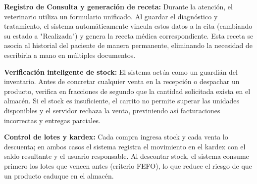 \documentclass[11pt,a4paper]{report}
\newcommand{\codigoreal}[6]{%
  }
\begin{document}
\codigoreal{codigo/CitaService.java}{78}{94}{Java}{Validación del horario de atención en CitaService.java}{lst:cita_horario}

\codigoreal{codigo/CitaService.java}{239}{256}{Java}{Prevención de traslapes de veterinario y mascota en CitaService.java}{lst:cita_traslape}

\textbf{Registro de Consulta y generación de receta:}
Durante la atención, el veterinario utiliza un formulario unificado. Al guardar el diagnóstico y tratamiento, el sistema automáticamente vincula estos datos a la cita (cambiando su estado a "Realizada") y genera la receta médica correspondiente. Esta receta se asocia al historial del paciente de manera permanente, eliminando la necesidad de escribirla a mano en múltiples documentos.

\textbf{Verificación inteligente de stock:}
El sistema actúa como un guardián del inventario. Antes de concretar cualquier venta en la recepción o despachar un producto, verifica en fracciones de segundo que la cantidad solicitada exista en el almacén. Si el stock es insuficiente, el carrito no permite superar las unidades disponibles y el servidor rechaza la venta, previniendo así facturaciones incorrectas y entregas parciales.

\textbf{Control de lotes y kardex:}
Cada compra ingresa stock y cada venta lo descuenta; en ambos casos el sistema registra el movimiento en el kardex con el saldo resultante y el usuario responsable. Al descontar stock, el sistema consume primero los lotes que vencen antes (criterio FEFO), lo que reduce el riesgo de que un producto caduque en el almacén.
\end{document}
